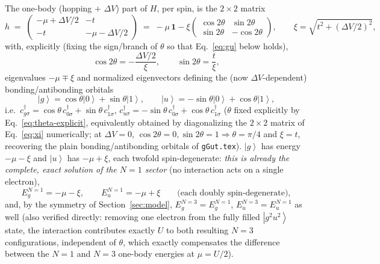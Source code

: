 \documentclass[11pt]{article}
\newcommand{\ket}[1]{\left|#1\right\rangle}
\begin{document}
The one-body (hopping $+$ $\Delta V$) part of $H$, per spin, is the $2\times2$ matrix
\begin{equation}
  h \;=\; \begin{pmatrix}-\mu+\Delta V/2 & -t\\ -t & -\mu-\Delta V/2\end{pmatrix}
  \;=\; -\mu\,\mathbf 1 - \xi\begin{pmatrix}\cos2\theta & \sin2\theta\\ \sin2\theta & -\cos2\theta\end{pmatrix},
  \qquad \xi=\sqrt{t^2+(\Delta V/2)^2},
  \label{eq:xi}
\end{equation}
with, explicitly (fixing the sign/branch of $\theta$ so that Eq.~\eqref{eq:gu} below holds),
\begin{equation}
  \cos2\theta = -\frac{\Delta V/2}{\xi}, \qquad \sin2\theta = \frac{t}{\xi},
  \label{eq:theta-explicit}
\end{equation}
eigenvalues $-\mu\mp\xi$ and normalized eigenvectors defining the (now $\Delta
V$-dependent) bonding/antibonding orbitals
\begin{equation}
  \ket{g}=\cos\theta\ket{0}+\sin\theta\ket{1},\qquad
  \ket{u}=-\sin\theta\ket{0}+\cos\theta\ket{1},
  \label{eq:gu}
\end{equation}
i.e.\ $c^{\dagger}_{g\sigma}=\cos\theta\,c^{\dagger}_{0\sigma}+\sin\theta\,c^{\dagger}_{1\sigma}$,
$c^{\dagger}_{u\sigma}=-\sin\theta\,c^{\dagger}_{0\sigma}+\cos\theta\,c^{\dagger}_{1\sigma}$
($\theta$ fixed explicitly by Eq.~\eqref{eq:theta-explicit}, equivalently obtained by
diagonalizing the $2\times2$ matrix of Eq.~\eqref{eq:xi} numerically; at $\Delta V=0$,
$\cos2\theta=0,\sin2\theta=1\Rightarrow\theta=\pi/4$ and $\xi=t$, recovering the plain
bonding/antibonding orbitals of \texttt{gGut.tex}). $\ket{g}$ has energy $-\mu-\xi$ and $\ket{u}$ has
$-\mu+\xi$, each twofold spin-degenerate: \emph{this is already the complete, exact
solution of the $N=1$ sector} (no interaction acts on a single electron),
\begin{equation}
  E^{N=1}_{g}=-\mu-\xi,\qquad E^{N=1}_{u}=-\mu+\xi\qquad\text{(each doubly spin-degenerate)},
  \label{eq:EN1}
\end{equation}
and, by the symmetry of Section~\ref{sec:model}, $E^{N=3}_{g}=E^{N=1}_{g}$,
$E^{N=3}_{u}=E^{N=1}_{u}$ as well (also verified directly: removing one electron from the
fully filled $\ket{g^2u^2}$ state, the interaction contributes exactly $U$ to both
resulting $N=3$ configurations, independent of $\theta$, which exactly compensates the
difference between the $N{=}1$ and $N{=}3$ one-body energies at $\mu=U/2$).
\end{document}
